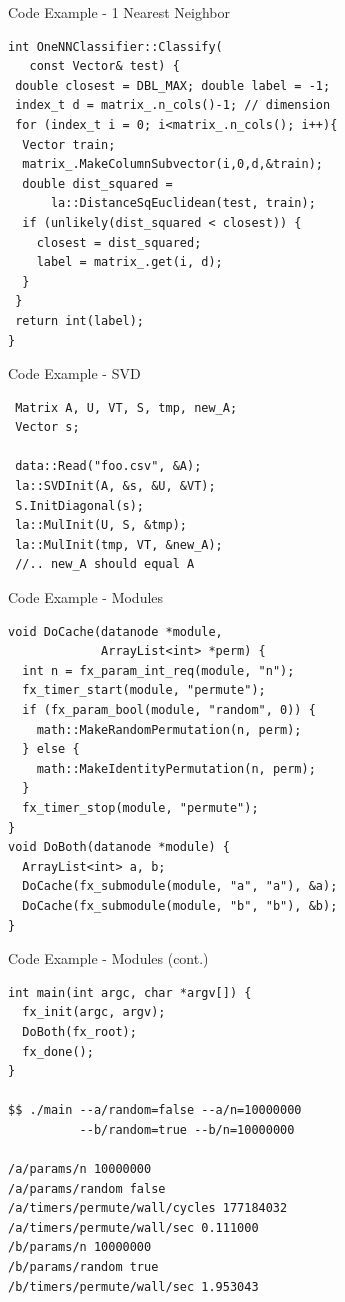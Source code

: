 \documentclass[pdf,colorBG,slideColor]{prosper}
\begin{document}
\begin{slide}{Code Example - 1 Nearest Neighbor}
 \vspace{-.17in}
\begin{verbatim}
int OneNNClassifier::Classify(
   const Vector& test) {
 double closest = DBL_MAX; double label = -1;
 index_t d = matrix_.n_cols()-1; // dimension
 for (index_t i = 0; i<matrix_.n_cols(); i++){
  Vector train;
  matrix_.MakeColumnSubvector(i,0,d,&train);
  double dist_squared =
      la::DistanceSqEuclidean(test, train);
  if (unlikely(dist_squared < closest)) {
    closest = dist_squared;
    label = matrix_.get(i, d);
  }
 }
 return int(label);
}
\end{verbatim}
\end{slide}

\begin{slide}{Code Example - SVD}
\vspace{-.17in}
\begin{verbatim}
 Matrix A, U, VT, S, tmp, new_A;
 Vector s;

 data::Read("foo.csv", &A);
 la::SVDInit(A, &s, &U, &VT);
 S.InitDiagonal(s);
 la::MulInit(U, S, &tmp);
 la::MulInit(tmp, VT, &new_A);
 //.. new_A should equal A
\end{verbatim}
\end{slide}

\begin{slide}{Code Example - Modules}
\vspace{-.17in}
\begin{verbatim}
void DoCache(datanode *module,
             ArrayList<int> *perm) {
  int n = fx_param_int_req(module, "n");
  fx_timer_start(module, "permute");
  if (fx_param_bool(module, "random", 0)) {
    math::MakeRandomPermutation(n, perm);
  } else {
    math::MakeIdentityPermutation(n, perm);
  }
  fx_timer_stop(module, "permute");
}
void DoBoth(datanode *module) {
  ArrayList<int> a, b;
  DoCache(fx_submodule(module, "a", "a"), &a);
  DoCache(fx_submodule(module, "b", "b"), &b);
}
\end{verbatim}
\end{slide}

\begin{slide}{Code Example - Modules (cont.)}
\vspace{-.17in}
\begin{verbatim}
int main(int argc, char *argv[]) {
  fx_init(argc, argv);
  DoBoth(fx_root);
  fx_done();
}

$$ ./main --a/random=false --a/n=10000000
          --b/random=true --b/n=10000000

/a/params/n 10000000
/a/params/random false
/a/timers/permute/wall/cycles 177184032
/a/timers/permute/wall/sec 0.111000
/b/params/n 10000000
/b/params/random true
/b/timers/permute/wall/sec 1.953043
\end{verbatim}
\end{slide}
\end{document}
